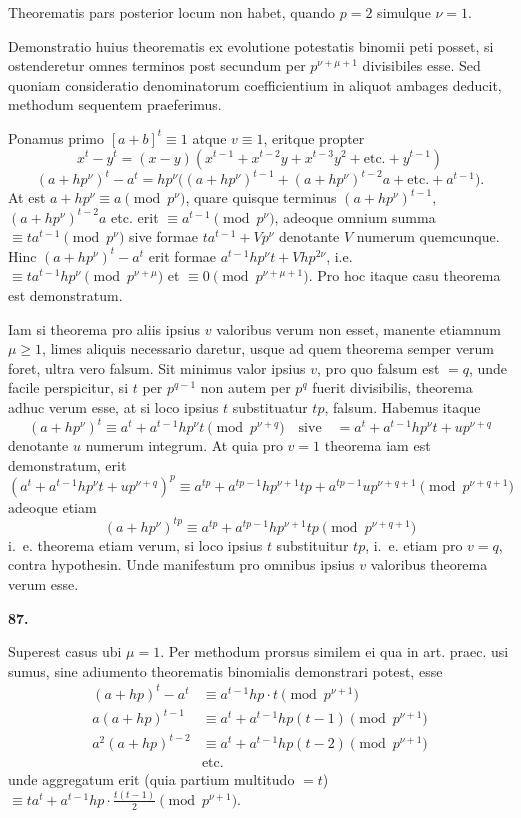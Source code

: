 \documentclass[12pt,a4paper]{article}
\theoremstyle{plain}
\theoremstyle{definition}
\theoremstyle{remark}
\begin{document}
Theorematis pars posterior locum non habet, quando $p=2$ simulque $\nu=1$.

Demonstratio huius theorematis ex evolutione potestatis binomii peti posset, si ostenderetur omnes terminos post secundum per $p^{\nu+\mu+1}$ divisibiles esse. Sed quoniam consideratio denominatorum coefficientium in aliquot ambages deducit, methodum sequentem praeferimus.

Ponamus primo $[a+b]^t \equiv 1$ atque $v \equiv 1$, eritque propter
\[x^t-y^t = (x-y)(x^{t-1}+x^{t-2}y+x^{t-3}y^2+\text{etc.}+y^{t-1})\]
\[(a+hp^\nu)^t - a^t = hp^\nu\bigl((a+hp^\nu)^{t-1} + (a+hp^\nu)^{t-2}a + \text{etc.} + a^{t-1}\bigr).\]
At est $a+hp^\nu \equiv a \pmod{p^\nu}$, quare quisque terminus $(a+hp^\nu)^{t-1}$, $(a+hp^\nu)^{t-2}a$ etc. erit $\equiv a^{t-1} \pmod{p^\nu}$, adeoque omnium summa $\equiv ta^{t-1} \pmod{p^\nu}$ sive formae $ta^{t-1}+Vp^\nu$ denotante $V$ numerum quemcunque. Hinc $(a+hp^\nu)^t - a^t$ erit formae $a^{t-1}hp^\nu t + Vhp^{2\nu}$, i.e. $\equiv ta^{t-1}hp^\nu \pmod{p^{\nu+\mu}}$ et $\equiv 0 \pmod{p^{\nu+\mu+1}}$. Pro hoc itaque casu theorema est demonstratum.

Iam si theorema pro aliis ipsius $v$ valoribus verum non esset, manente etiamnum $\mu \geq 1$, limes aliquis necessario daretur, usque ad quem theorema semper verum foret, ultra vero falsum. Sit minimus valor ipsius $v$, pro quo falsum est $=q$, unde facile perspicitur, si $t$ per $p^{q-1}$ non autem per $p^q$ fuerit divisibilis, theorema adhuc verum esse, at si loco ipsius $t$ substituatur $tp$, falsum. Habemus itaque
\[(a+hp^\nu)^t \equiv a^t + a^{t-1}hp^\nu t \pmod{p^{\nu+q}}\quad\text{sive}\quad = a^t + a^{t-1}hp^\nu t + up^{\nu+q}\]
denotante $u$ numerum integrum. At quia pro $v=1$ theorema iam est demonstratum, erit
\[(a^t + a^{t-1}hp^\nu t + up^{\nu+q})^p \equiv a^{tp} + a^{tp-1}hp^{\nu+1}tp + a^{tp-1}up^{\nu+q+1} \pmod{p^{\nu+q+1}}\]
adeoque etiam
\[(a+hp^\nu)^{tp} \equiv a^{tp} + a^{tp-1}hp^{\nu+1}tp \pmod{p^{\nu+q+1}}\]
i.~e. theorema etiam verum, si loco ipsius $t$ substituitur $tp$, i.~e. etiam pro $v=q$, contra hypothesin. Unde manifestum pro omnibus ipsius $v$ valoribus theorema verum esse.

\setcounter{satz}{87}
\addtocounter{satz}{-1}
\textbf{87.}

Superest casus ubi $\mu=1$. Per methodum prorsus similem ei qua in art. praec. usi sumus, sine adiumento theorematis binomialis demonstrari potest, esse
\begin{align*}
(a+hp)^t - a^t &\equiv a^{t-1}hp \cdot t \pmod{p^{\nu+1}} \\
a(a+hp)^{t-1} &\equiv a^t + a^{t-1}hp(t-1) \pmod{p^{\nu+1}} \\
a^2(a+hp)^{t-2} &\equiv a^t + a^{t-1}hp(t-2) \pmod{p^{\nu+1}} \\
&\text{etc.}
\end{align*}
unde aggregatum erit (quia partium multitudo $=t$) $\equiv ta^t + a^{t-1}hp \cdot \frac{t(t-1)}{2} \pmod{p^{\nu+1}}$.
\end{document}
